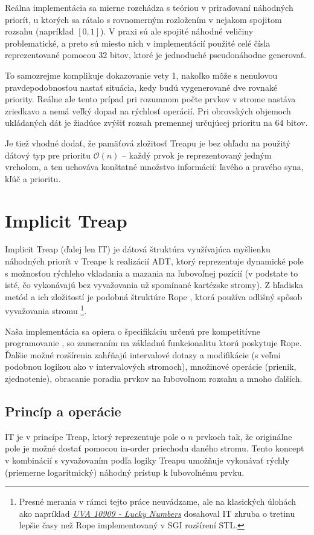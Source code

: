 \documentclass[a4paper, 12pt]{article}
\theoremstyle{definition}
\begin{document}
Reálna implementácia sa mierne rozchádza s teóriou v priraďovaní
náhodných priorít, u ktorých sa rátalo s rovnomerným rozložením v nejakom
spojitom rozsahu (napríklad $[0, 1]$). V praxi sú ale spojité náhodné veličiny
problematické, a preto sú miesto nich v implementácií použité celé čísla
reprezentované pomocou 32 bitov, ktoré je jednoduché pseudonáhodne generovať.

To samozrejme komplikuje dokazovanie vety 1, nakoľko môže s nenulovou
pravdepodobnosťou nastať situácia, kedy budú vygenerované dve rovnaké priority.
Reálne ale tento prípad pri rozumnom počte prvkov v strome nastáva zriedkavo a
nemá veľký dopad na rýchlosť operácií. Pri obrovských objemoch ukládaných
dát je žiadúce zvýšiť rozsah premennej určujúcej prioritu na 64 bitov.

Je tiež vhodné dodať, že pamäťová zložitosť Treapu je bez ohľadu na použitý
dátový typ pre prioritu $\mathcal{O}(n)$ -- každý prvok je reprezentovaný
jedným vrcholom, a ten uchováva konštatné množstvo informácií: ľavého a pravého
syna, kľúč a prioritu.

\section{Implicit Treap}

Implicit Treap (ďalej len IT) je dátová štruktúra využívajúca myšlienku
náhodných priorít v Treape k realizácií ADT, ktorý reprezentuje dynamické pole
s možnosťou rýchleho vkladania a mazania na ľubovoľnej pozícií (v podstate to
isté, čo vykonávajú bez vyvažovania už spomínané kartézske stromy). Z hľadiska
metód a ich zložitostí je podobná štruktúre Rope \cite{rope}, ktorá
používa odlišný spôsob vyvažovania stromu \footnote{Presné merania v rámci
tejto práce neuvádzame, ale na klasických úlohách ako napríklad
\href{https://uva.onlinejudge.org/index.php?option=com_onlinejudge&Itemid=8&page=show_problem&problem=1850}
{\emph{UVA 10909 - Lucky Numbers}} dosahoval IT zhruba o tretinu lepšie časy
než Rope implementovaný v SGI rozšírení STL.}.

Naša implementácia sa opiera o špecifikáciu určenú pre kompetitívne
programovanie \cite{emaxx}, so zameraním na základnú funkcionalitu ktorú
poskytuje Rope. Ďalšie možné rozšírenia zahŕňajú intervalové dotazy a
modifikácie (s veľmi podobnou logikou ako v intervalových stromoch), množinové
operácie (prienik, zjednotenie), obracanie poradia prvkov na ľubovoľnom rozsahu
a mnoho ďalších.

\subsection{Princíp a operácie}
IT je v princípe Treap, ktorý reprezentuje pole o $n$ prvkoch tak, že
originálne pole je možné dostať pomocou in-order priechodu daného stromu. Tento
koncept v kombinácií s vyvažovaním podľa logiky Treapu umožňuje vykonávať
rýchly (priemerne logaritmický) náhodný prístup k ľubovoľnému prvku.
\end{document}
